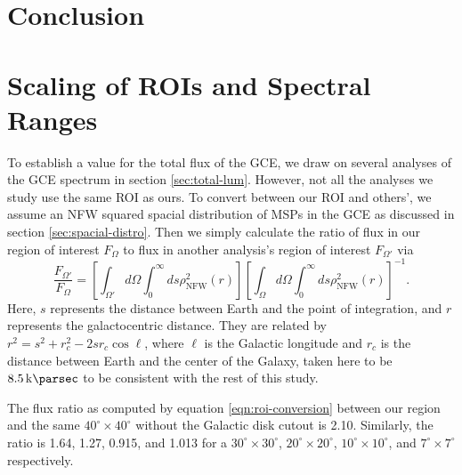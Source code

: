 \documentclass[a4paper,11pt]{article}
\newcommand{\brackets}[1]{\left[#1\right]}
\newcommand{\comment}[1]{\emph{\color{red}{#1}}}
\begin{document}
\section{Conclusion}
\comment{I thought I'd leave writing the introduction and conclusion until the rest of the paper is done, in case things change.}

\comment{Effect of our research on the predictions by Fermilab}

\comment{Number of pulsars in the GCE}

\comment{Comparison between the GCE- and GCL-derived luminosity functions and which matches observations more accurately}

\comment{The observed flux distribution matches the predicted distribution of MSPs, but is not sensitive to the luminosity function}

\comment{Future sensitivity}


\appendix
\section{Scaling of ROIs and Spectral Ranges}
\label{app:roi-rescale}
To establish a value for the total flux of the GCE, we draw on several analyses of the GCE spectrum in section \ref{sec:total-lum}. However, not all the analyses we study use the same ROI as ours. To convert between our ROI and others', we assume an NFW squared spacial distribution of MSPs in the GCE as discussed in section \ref{sec:spacial-distro}. Then we simply calculate the ratio of flux in our region of interest $F_\Omega$ to flux in another analysis's region of interest $F_{\Omega'}$ via
\begin{equation}
    \frac{F_{\Omega'}}{F_\Omega} = \brackets{\int_{\Omega'}d\Omega\int_0^\infty ds \rho_\text{NFW}^2 (r)}\brackets{\int_{\Omega}d\Omega\int_0^\infty ds \rho_\text{NFW}^2 (r)}^{-1}.
    \label{eqn:roi-conversion}
\end{equation}
Here, $s$ represents the distance between Earth and the point of integration, and $r$ represents the galactocentric distance. They are related by $r^2 = s^2 + r_c^2 - 2 s r_c \cos\ell$, where $\ell$ is the Galactic longitude and $r_c$ is the distance between Earth and the center of the Galaxy, taken here to be $\SI{8.5}{\kilo\parsec}$ to be consistent with the rest of this study.

The flux ratio as computed by equation \ref{eqn:roi-conversion} between our region and the same $40^\circ \times 40^\circ$ without the Galactic disk cutout is 2.10. Similarly, the ratio is 1.64, 1.27, 0.915, and 1.013 \comment{Wrong!} for a $30^\circ \times 30^\circ $, $20^\circ \times 20^\circ$, $10^\circ \times 10^\circ$, and $7^\circ \times 7^\circ$ respectively.
\end{document}
